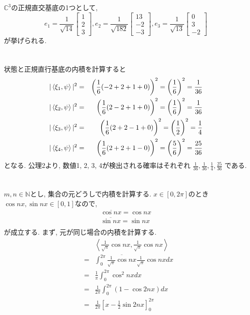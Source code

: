 \documentclass[a4paper,11pt]{jsarticle}
\begin{document}
\section{}
$\mathbb{C}^3$の正規直交基底の1つとして, 
\[
  e_1 = \frac{1}{\sqrt{14}}\begin{bmatrix}
    1 \\ 2 \\ 3
  \end{bmatrix}, 
  e_2 = \frac{1}{\sqrt{182}}\begin{bmatrix}
    13 \\ -2 \\ -3
  \end{bmatrix},
  e_3 = \frac{1}{\sqrt{13}}\begin{bmatrix}
    0 \\ 3 \\ -2
  \end{bmatrix}
\]
が挙げられる.

\section{}

状態と正規直行基底の内積を計算すると
\begin{eqnarray*}
  |\braket{\xi_1, \psi}|^2
  &=& \left(\frac{1}{6}(-2 + 2 + 1 + 0)\right)^2
  = \left(\frac{1}{6}\right)^2 = \frac{1}{36} \\
  |\braket{\xi_2, \psi}|^2
  &=& \left(\frac{1}{6}(2 - 2 + 1 + 0)\right)^2
  = \left(\frac{1}{6}\right)^2 = \frac{1}{36} \\
  |\braket{\xi_3, \psi}|^2
  &=& \left(\frac{1}{6}(2 + 2 - 1 + 0)\right)^2
  = \left(\frac{1}{2}\right)^2 = \frac{1}{4} \\
  |\braket{\xi_4, \psi}|^2
  &=& \left(\frac{1}{6}(2 + 2 + 1 - 0)\right)^2
  = \left(\frac{5}{6}\right)^2 = \frac{25}{36}
\end{eqnarray*}
となる. 公理2より, 数値1, 2, 3, 4が検出される確率はそれぞれ
$\frac{1}{36}, \frac{1}{36}, \frac{1}{4}, \frac{25}{36}$
である.

\section{}
$m, n \in \mathbb{N}$とし, 集合の元どうしで内積を計算する.
$x \in [0, 2\pi]$のとき$\cos{nx}, \sin{nx} \in [0, 1]$なので, 
\begin{eqnarray*}
  \overline{\cos{nx}} = \cos{nx} \\
  \overline{\sin{nx}} = \sin{nx} \\
\end{eqnarray*}
が成立する. まず, 元が同じ場合の内積を計算する.
\begin{eqnarray*}
  &&\left<\frac{1}{\sqrt{\pi}}\cos{nx}, \frac{1}{\sqrt{\pi}}\cos{nx}\right> \\
  &=& \int_{0}^{2\pi}{\overline{\frac{1}{\sqrt{\pi}}\cos{nx}}\frac{1}{\sqrt{\pi}}\cos{nx}}dx \\
  &=& \frac{1}{\pi}\int_{0}^{2\pi}{\cos^{2}{nx}}dx \\
  &=& \frac{1}{2\pi}\int_{0}^{2\pi}{\left(1 - \cos{2nx}\right)}dx \\
  &=& \frac{1}{2\pi}\left[x - \frac{1}{2}\sin{2nx}\right]_{0}^{2\pi}
\end{eqnarray*}
\end{document}

